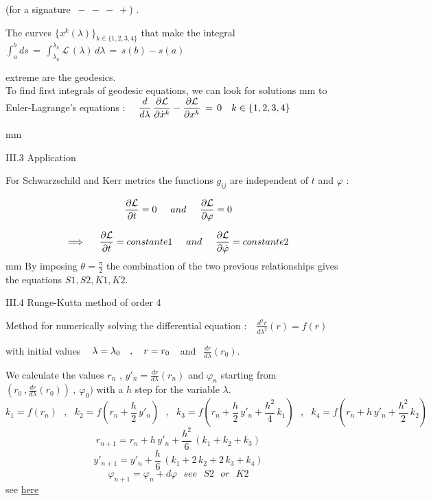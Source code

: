 \documentclass [12pt]{article}
\def\ph#1{\hskip #1}
\def\pv#1{\vskip #1}
\begin{document}
		(for a signature $\ -\ -\ -\ +$) . 


		The curves $\{x^k(\lambda)\}_{k\in\{1,2,3,4\} }$ that make the integral $\displaystyle \int_a^b ds\,=\,\int_{\lambda_a}^{\lambda_b} \mathcal L \,(\lambda)\,d\lambda\,=\,s(b)-s(a)$ 
				
				extreme are the geodesics. \\ 

		To find first integrals of geodesic equations, we can look for solutions \pv 2mm
		to Euler-Lagrange's equations :
		$\ \ \ \displaystyle {d\over d\lambda}\,{\partial\mathcal L \over \partial\dot x^k} -{\partial\mathcal L\over \partial x^k}\,=\,0 \ \ \ k\in\{1,2,3,4\}$  
		 
			\pv 2mm
		
		\hypertarget{ancre08}{{\bidon III.3  Application }} 
		 
		 
		  For Schwarzschild and Kerr metrics the functions $g_{ij}$ are independent of $t$ and $\varphi$  :
			
		$$ \displaystyle\frac{\partial\mathcal L}{\partial t}=0  \ph 5mm  and  \ph 5mm \displaystyle\frac{\partial\mathcal L}{\partial\varphi}=0 $$
		
		$$\Longrightarrow \ph 5mm \displaystyle\frac{\partial\mathcal L}{\partial\dot t}= constante1 \ph 5mm  and  \ph 5mm \displaystyle\frac{\partial\mathcal L}{\partial\dot\varphi}=  constante2 $$ 
		\pv 3mm
		By imposing $\displaystyle\theta =\frac{\pi}{2}$ the combination of the two previous relationships gives the equations $S1,S2,K1,K2$.
		 

		\hypertarget{ancre09}{{\bidon III.4  Runge-Kutta method of order 4 } }
		 		 

		  Method for numerically solving the differential equation :
        $~~~\displaystyle\frac{d^2r}{d\lambda^2}(r)= f(r)$ 
				
				with initial values $\ph 3mm \lambda=\lambda_0~~~,~~~r=r_0~~ $ and $~~ \displaystyle\frac{dr}{d\lambda}(r_0)$.  

		We calculate the values $r_n$ , $y'_n=\displaystyle\frac{dr}{d\lambda}(r_n)$ and $\varphi_n$ starting from $(r_0\ ,\displaystyle\frac{dr}{d\lambda}(r_0))\ ,\ \varphi_0)$
		with a $h$ step for the variable $\lambda$.	
			\pv -5mm
		$$k_1 = f(r_n) \ \ \ , \ \ \  k_2 = f (r_n + \frac{h}{2}\,y'_n) \ \ \ ,\ \ \ k_3 = f(r_n + \frac{h}{2}\,y'_n+\frac{h^2}{4}\,k_1)\ \ \ ,\ \ \ k_4 = f(r_n + h\,y'_n+\frac{h^2}{2}\,k_2)$$
        $$r_{n+1} = r_n +h\,y'_n+\frac{h^2}{6}\,(k_1+k_2+k_3)$$
        $$y'_{n+1}=y'_n+\frac{h}{6}\,(k_1+2\,k_2+2\,k_3+k_4)$$
		$$ \varphi_{n+1}=\varphi_n+d\varphi ~~~ see ~~~ S2~~~ or ~~~ K2$$ \pv -2mm
		see \href{./documents/Rungekutta.pdf}{\textcolor{bleu}{here} }
		
\end{document}
